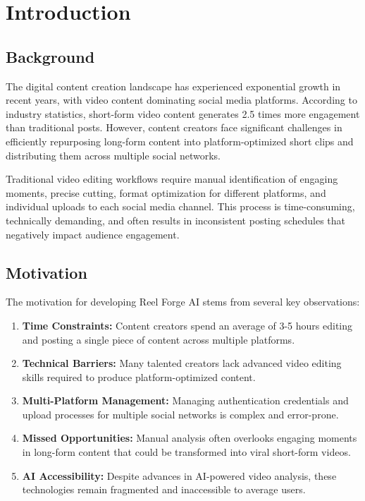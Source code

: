 \chapter{Introduction}

\section{Background}

The digital content creation landscape has experienced exponential growth in recent years, with video content dominating social media platforms. According to industry statistics, short-form video content generates 2.5 times more engagement than traditional posts. However, content creators face significant challenges in efficiently repurposing long-form content into platform-optimized short clips and distributing them across multiple social networks.

Traditional video editing workflows require manual identification of engaging moments, precise cutting, format optimization for different platforms, and individual uploads to each social media channel. This process is time-consuming, technically demanding, and often results in inconsistent posting schedules that negatively impact audience engagement.

\section{Motivation}

The motivation for developing Reel Forge AI stems from several key observations:

\begin{enumerate}
    \item \textbf{Time Constraints:} Content creators spend an average of 3-5 hours editing and posting a single piece of content across multiple platforms.
    
    \item \textbf{Technical Barriers:} Many talented creators lack advanced video editing skills required to produce platform-optimized content.
    
    \item \textbf{Multi-Platform Management:} Managing authentication credentials and upload processes for multiple social networks is complex and error-prone.
    
    \item \textbf{Missed Opportunities:} Manual analysis often overlooks engaging moments in long-form content that could be transformed into viral short-form videos.
    
    \item \textbf{AI Accessibility:} Despite advances in AI-powered video analysis, these technologies remain fragmented and inaccessible to average users.
\end{enumerate}


